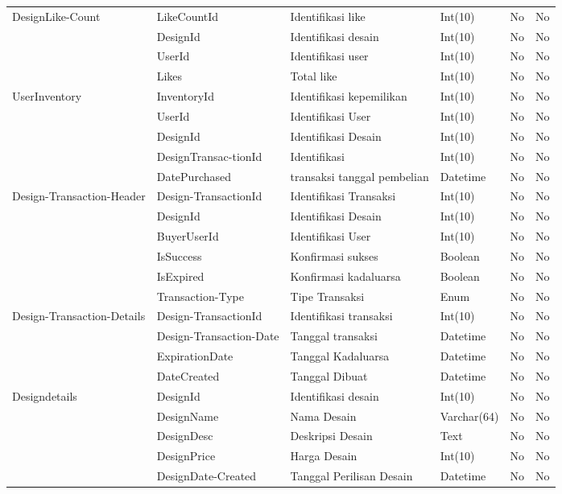 \begin{longtable}{| p{2.2cm} | p{2.5cm} | p{3.4cm} | p{2.2cm} | l | p{1.3cm} |}
		DesignLike-Count	& LikeCountId	& Identifikasi like		& Int(10)	& No & No \\
						& DesignId		& Identifikasi desain	& Int(10)	& No & No \\
						& UserId		& Identifikasi user		& Int(10)	& No & No \\
						& Likes			& Total like			& Int(10)	& No & No \\ \hline
		
		UserInventory	& InventoryId			& Identifikasi kepemilikan		& Int(10)	& No & No \\
						& UserId				& Identifikasi User				& Int(10)	& No & No \\
						& DesignId				& Identifikasi Desain			& Int(10)	& No & No \\
						& DesignTransac-tionId	& Identifikasi					& Int(10)	& No & No \\
						& DatePurchased			& transaksi tanggal pembelian	& Datetime	& No & No \\ \hline
						
		Design-Transaction-Header	& Design-TransactionId	& Identifikasi Transaksi	& Int(10)	& No & No \\
									& DesignId				& Identifikasi Desain		& Int(10)	& No & No \\
									& BuyerUserId			& Identifikasi User			& Int(10)	& No & No \\
									& IsSuccess				& Konfirmasi sukses			& Boolean	& No & No \\
									& IsExpired				& Konfirmasi kadaluarsa		& Boolean	& No & No \\
									& Transaction-Type		& Tipe Transaksi			& Enum		& No & No \\ \hline
									
		Design-Transaction-Details	& Design-TransactionId	& Identifikasi transaksi	& Int(10)	& No & No \\
									& Design-Transaction-Date & Tanggal transaksi			& Datetime	& No & No \\
									& ExpirationDate		& Tanggal Kadaluarsa		& Datetime	& No & No \\
									& DateCreated			& Tanggal Dibuat			& Datetime	& No & No \\ \hline
		
		Designdetails	& DesignId			& Identifikasi desain		& Int(10)		& No & No \\
						& DesignName		& Nama Desain				& Varchar(64)	& No & No \\
						& DesignDesc		& Deskripsi Desain			& Text			& No & No \\
						& DesignPrice		& Harga Desain				& Int(10)		& No & No \\
						& DesignDate-Created & Tanggal Perilisan Desain	& Datetime		& No & No \\ \hline
		

\end{longtable}
